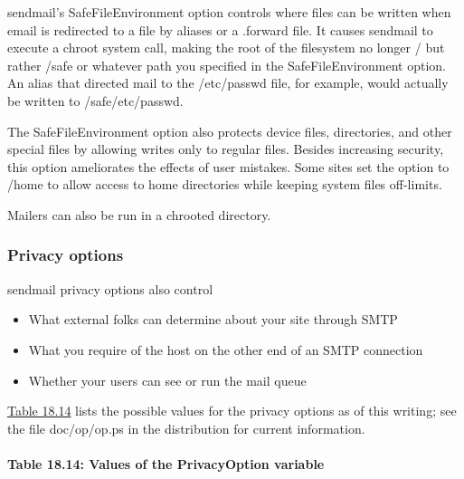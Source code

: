 
{sendmail}'s {SafeFileEnvironment} option controls where files can be
written when email is redirected to a file by {aliases} or a {.forward}
file. It causes {sendmail} to execute a {chroot} system call, making the
root of the filesystem no longer {/} but rather {/safe} or whatever path
you specified in the {SafeFileEnvironment} option. An alias that
directed mail to the {/etc/passwd} file, for example, would actually be
written to {/safe/etc/passwd}.

The {SafeFileEnvironment} option also protects device files,
directories, and other special files by allowing writes only to regular
files. Besides increasing security, this option ameliorates the effects
of user mistakes. Some sites set the option to {/home} to allow access
to home directories while keeping system files off-limits.

Mailers can also be run in a {chroot}ed directory.

\subsubsection[Privacy
options]{\texorpdfstring{Priv\protect\hypertarget{part0026_split_038.htmlux5cux23_idTextAnchor1109}{}{}acy
options}{Privacy options}}

\protect\hypertarget{part0026_split_038.htmlux5cux23_idIndexMarker2585}{}{}\protect\hypertarget{part0026_split_038.htmlux5cux23_idIndexMarker2586}{}{}{sendmail}
privacy options also control

\begin{itemize}
\item
  What external folks can determine about your site through SMTP
\item
  What you require of the host on the other end of an SMTP connection
\item
  Whether your users can see or run the mail queue
\end{itemize}

\protect\hyperlink{part0026_split_038.htmlux5cux23_idTextAnchor1110}{Table
18.14} lists the possible values for the privacy options as of this
writing; see the file {doc/op/op.ps} in the distribution for current
information.

\paragraph[{Table 18.14: }Values of the {PrivacyOption}
variable]{\texorpdfstring{{Table 18.14:
}\protect\hypertarget{part0026_split_038.htmlux5cux23_idIndexMarker2587}{}{}\protect\hypertarget{part0026_split_038.htmlux5cux23_idTextAnchor1110}{}{}\protect\hypertarget{part0026_split_038.htmlux5cux23_idTextAnchor1111}{}{}Values
of the {PrivacyOption}
variable}{Table 18.14: Values of the PrivacyOption variable}}

